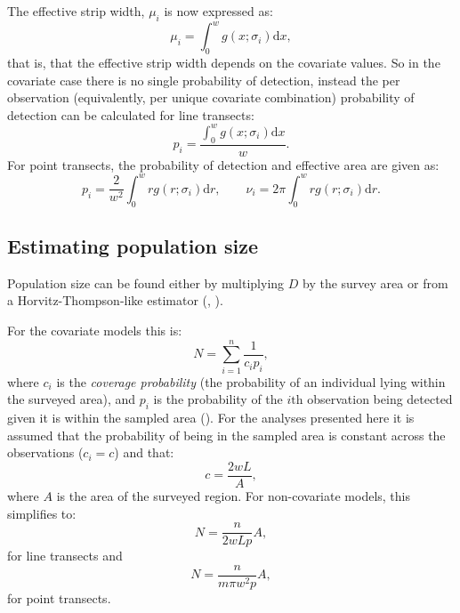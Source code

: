 The effective strip width, $\mu_i$ is now expressed as:
\begin{equation}
\mu_i = \int_0^w g(x ; \sigma_i) \text{d}x,
\label{intro-ds-mu-covar}
\end{equation}
that is, that the effective strip width depends on the covariate values. So in the covariate case there is no single probability of detection, instead the per observation (equivalently, per unique covariate combination) probability of detection can be calculated for line transects:
\begin{equation*}
p_i = \frac{\int_0^w g(x ; \sigma_{i}) \text{d}x}{w}.
\end{equation*}
For point transects, the probability of detection and effective area are given as:
\begin{equation*}
p_i =\frac{2}{w^2}\int_0^w r g(r; \sigma_i) \text{d}r, \qquad \nu_i = 2\pi \int_0^w r g(r; \sigma_i) \text{d}r.
\end{equation*}
\label{cor-7s11}

\subsection{Estimating population size}
\label{intro-ds-pop-size}

Population size can be found either by multiplying $D$ by the survey area or from a Horvitz-Thompson-like estimator (\cite[pp. 53-56]{thompson}, \cite[p. 23]{ADS}).

For the covariate models this is:
\begin{equation}
N = \sum_{i=1}^n \frac{1}{c_i p_i},
\label{HT-ds-est}
\end{equation}
where $c_i$ is the \textit{coverage probability} (the probability of an individual lying within the surveyed area), and $p_i$ is the probability of the $i\text{th}$ observation being detected given it is within the sampled area (\cite[p. 7 and 38]{ADS}). For the analyses presented here it is assumed that the probability of being in the sampled area is constant across the observations ($c_i=c$) and that:
\begin{equation*}
c=\frac{2wL}{A},
\end{equation*}
where $A$ is the area of the surveyed region. For non-covariate models, this simplifies to:
\begin{equation*}
N =  \frac{n}{2 w L p}A,
\end{equation*}
for line transects and
\begin{equation*}
N =  \frac{n}{m \pi w^2 p}A,
\end{equation*}
for point transects.

